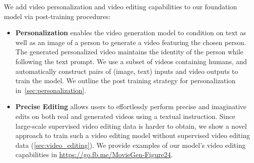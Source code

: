   We add video personalization and video editing capabilities to our foundation \OursVideo model via post-training procedures:
  \begin{itemize}
    \item \textbf{Personalization} enables the video generation model to condition on text as well as an image of a person to generate a video featuring the chosen person. The generated  personalized video maintains the identity of the person while following the text prompt. We use a subset of videos containing humans, and automatically construct pairs of (image, text) inputs and video outputs to train the model. We outline the post training strategy for personalization in~\cref{sec:personalization}.
    \item \textbf{Precise Editing} allows users to effortlessly perform precise and imaginative edits on both real and generated videos using a textual instruction. Since large-scale supervised video editing data is harder to obtain, we show a novel approach to train such a video editing model without supervised video editing data (\cref{sec:video_editing}). We provide examples of our model's video editing capabilities in \url{https://go.fb.me/MovieGen-Figure24}.
  \end{itemize}
